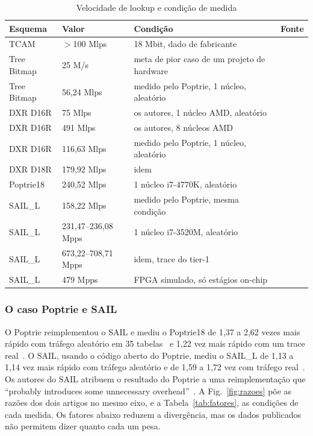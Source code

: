 \documentclass[conference,a4paper]{IEEEtran}
\begin{document}
\begin{table}[t]
\centering
\caption{Velocidade de lookup e condição de medida}
\label{tab:velocidade}
\footnotesize
\renewcommand{\arraystretch}{1.15}
\begin{tabular}{P{1.6cm} P{1.6cm} P{2.75cm} P{1.0cm}}
\toprule
Esquema & Valor & Condição & Fonte \\
\midrule
TCAM & $>$100 Mlps & 18 Mbit, dado de fabricante & \cite[\S II]{zane03} \\
Tree Bitmap & 25 M/s & meta de pior caso de um projeto de hardware & \cite[\S7.2]{eath04} \\
Tree Bitmap & 56,24 Mlps & medido pelo Poptrie, 1 núcleo, aleatório & \cite[Tab.~3]{asai15} \\
DXR D16R & 75 Mlps & os autores, 1 núcleo AMD, aleatório & \cite[Tab.~2]{zec12} \\
DXR D16R & 491 Mlps & os autores, 8 núcleos AMD & \cite[Tab.~2]{zec12} \\
DXR D16R & 116,63 Mlps & medido pelo Poptrie, 1 núcleo, aleatório & \cite[Tab.~3]{asai15} \\
DXR D18R & 179,92 Mlps & idem & \cite[Tab.~3]{asai15} \\
Poptrie18 & 240,52 Mlps & 1 núcleo i7-4770K, aleatório & \cite[Tab.~3]{asai15} \\
SAIL\_L & 158,22 Mlps & medido pelo Poptrie, mesma condição & \cite[Tab.~3]{asai15} \\
SAIL\_L & 231,47--236,08 Mpps & 1 núcleo i7-3520M, aleatório & \cite[\S VI-C]{yang18} \\
SAIL\_L & 673,22--708,71 Mpps & idem, trace do tier-1 & \cite[\S VI-C]{yang18} \\
SAIL\_L & 479 Mpps & FPGA simulado, só estágios on-chip & \cite[\S VI-B]{yang18} \\
\bottomrule
\end{tabular}
\end{table}

\subsubsection{O caso Poptrie e SAIL}
O Poptrie reimplementou o SAIL e mediu o Poptrie18 de 1,37 a 2,62 vezes mais rápido com tráfego aleatório em 35
tabelas~\cite[\S4.5]{asai15} e 1,22 vez mais rápido com um trace real~\cite[\S4.7]{asai15}. O SAIL, usando o código aberto
do Poptrie, mediu o SAIL\_L de 1,13 a 1,14 vez mais rápido com tráfego aleatório e de 1,59 a 1,72 vez com tráfego
real~\cite[\S VI-C]{yang18}. Os autores do SAIL atribuem o resultado do Poptrie a uma reimplementação que
``probably introduces some unnecessary overhead''~\cite[\S VI-C]{yang18}. A Fig.~\ref{fig:razoes} põe as razões dos dois
artigos no mesmo eixo, e a Tabela~\ref{tab:fatores}, as condições de cada medida. Os fatores abaixo reduzem a
divergência, mas os dados publicados não permitem dizer quanto cada um pesa.
\end{document}
